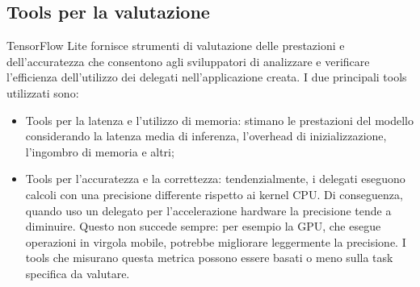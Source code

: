 \subsection{Tools per la valutazione}
TensorFlow Lite fornisce strumenti di valutazione delle prestazioni e dell’accuratezza che consentono agli sviluppatori di analizzare e verificare
l’efficienza dell’utilizzo dei delegati nell’applicazione creata. I due principali tools utilizzati sono:
\begin{itemize}
    \item Tools per la latenza e l’utilizzo di memoria: stimano le prestazioni del modello considerando la latenza media di inferenza,
    l’overhead di inizializzazione, l’ingombro di memoria e altri;
    \item Tools per l’accuratezza e la correttezza: tendenzialmente, i delegati eseguono calcoli con una precisione differente rispetto ai kernel CPU.
    Di conseguenza, quando uso un delegato per l’accelerazione hardware la precisione tende a diminuire. Questo non succede sempre: per esempio la GPU,
    che esegue operazioni in virgola mobile, potrebbe migliorare leggermente la precisione. I tools che misurano questa metrica possono essere basati o
    meno sulla task specifica da valutare.
\end{itemize}